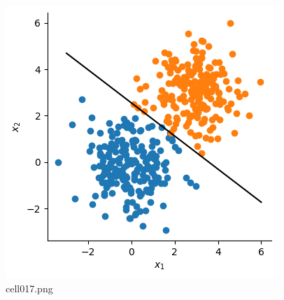 \begin{figure}[ht]
	\centering
	\includegraphics[scale=0.8, max width=\linewidth]{./fig/local-learning-rule/logistic-regression-perceptron/cell017.png}
	\caption{cell017.png}
	\label{cell017.png}
\end{figure}
